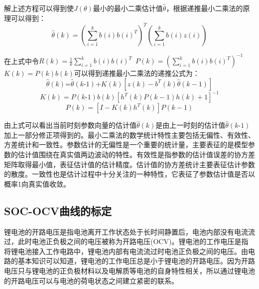 解上述方程可以得到使$J\left( \theta  \right)$最小的最小二乘估计值$\hat{\theta }$，根据递推最小二乘法的原理可以得到：
\begin{equation}
\hat{\theta }\left( k \right)={{\left( \sum\limits_{i=1}^{k}{b\left( i \right)b{{\left( i \right)}^{T}}} \right)}^{T}}\left( \sum\limits_{i=1}^{k}{b\left( i \right)z\left( i \right)} \right)
\end{equation}

在上式中令$R\left( k \right)=\frac{1}{k}\sum\limits_{i=1}^{k}{b\left( i \right)b{{\left( i \right)}^{T}}}$~$P\left( k \right)={{\left( \sum\limits_{i=1}^{k}{b\left( i \right)b{{\left( i \right)}^{T}}} \right)}^{-1}}$~$K\left( k \right)=P\left( k \right)b\left( k \right)$可以得到递推最小二乘法的递推公式为：
\begin{equation}
\hat{\theta }\left( k \right)\text{=}\hat{\theta }\left( k\text{-}1 \right)\text{+}K\left( k \right)\left[ z\left( k \right)-{{b}^{T}}\left( k \right)\hat{\theta }\left( k-1 \right) \right]
\end{equation}
\begin{equation}
K\left( k \right)=P\left( k\text{-}1 \right)b\left( k \right){{\left[ {{h}^{T}}\left( k \right)P\left( k-1 \right)h\left( k \right)+1 \right]}^{-1}}
\end{equation}
\begin{equation}
P\left( k \right)=\left[ I-K\left( k \right){{h}^{T}}\left( k \right) \right]P\left( k-1 \right)
\end{equation}

由上式可以看出当前时刻参数向量的估计值$\hat{\theta }\left( k \right)$是由上一时刻的估计值$\hat{\theta }\left( k\text{-}1 \right)$加上一部分修正项得到的。最小二乘法的数学统计特性主要包括无偏性、有效性、方差统计和一致性。参数估计的无偏性是一个重要的统计量，主要表征的是模型参数的估计值围绕在真实值两边波动的特性。有效性是指参数的估计值误差的协方差矩阵取得最小值，表征估计值的估计精度。估计值的协方差统计主要表征估计参数的散度。一致性也是估计过程中十分关注的一种特性，它表征了参数估计值是否以概率1向真实值收敛。
\subsection{SOC-OCV曲线的标定}
锂电池的开路电压是指电池离开工作状态处于长时间静置后，电池内部没有电流流过，此时电池正负极之间的电压被称为开路电压(OCV)。锂电池的工作电压是指将锂电池接入工作电路中，锂电池内部有电流流过时电池正负极之间的电压。由电路的基本知识可以知道，锂电池的工作电压总是小于锂电池的开路电压。因为开路电压只与锂电池的正负极材料以及电解质等电池的自身特性相关，所以通过锂电池的开路电压可以与电池的荷电状态之间建立紧密的联系。

